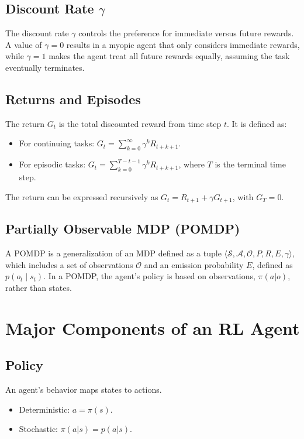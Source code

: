 \documentclass[12pt]{article}
\begin{document}
\subsection{Discount Rate $\gamma$}
The discount rate $\gamma$ controls the preference for immediate versus future rewards. A value of $\gamma=0$ results in a myopic agent that only considers immediate rewards, while $\gamma=1$ makes the agent treat all future rewards equally, assuming the task eventually terminates.

\subsection{Returns and Episodes}
The return $G_t$ is the total discounted reward from time step $t$. It is defined as:
\begin{itemize}
    \item For continuing tasks: $G_t = \sum_{k=0}^\infty \gamma^k R_{t+k+1}$.
    \item For episodic tasks: $G_t = \sum_{k=0}^{T-t-1} \gamma^k R_{t+k+1}$, where $T$ is the terminal time step.
\end{itemize}
The return can be expressed recursively as $G_t = R_{t+1} + \gamma G_{t+1}$, with $G_T = 0$.

\subsection{Partially Observable MDP (POMDP)}
A POMDP is a generalization of an MDP defined as a tuple $\langle \mathcal{S}, \mathcal{A}, \mathcal{O}, P, R, E, \gamma \rangle$, which includes a set of observations $\mathcal{O}$ and an emission probability $E$, defined as $p(o_t \mid s_t)$. In a POMDP, the agent's policy is based on observations, $\pi(a|o)$, rather than states.


\section{Major Components of an RL Agent }

\subsection{Policy}
An agent's behavior maps states to actions.
\begin{itemize}
    \item Deterministic: $a = \pi(s)$.
    \item Stochastic: $\pi(a|s) = p(a|s)$.
\end{itemize}
\end{document}
